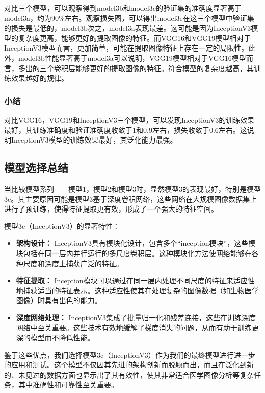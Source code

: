 对比三个模型，可以观察得到model3b和model3c的验证集的准确度显著高于model3a，约为90\%左右。观察损失图，可以得出model3c在这三个模型中验证集的损失是最低的，model3b次之，model3a表现最差。这可能是因为InceptionV3模型的复杂度更高，能够更好的提取图像的特征。而VGG16和VGG19模型相对于InceptionV3模型而言，更加简单，可能在提取图像特征上存在一定的局限性。此外，model3b性能显著高于model3a可以说明，VGG19模型相对于VGG16模型而言，多出的三个卷积层能够更好的提取图像的特征。符合模型的复杂度越高，其训练效果越好的规律。

\subsubsection{小结}

对比VGG16，VGG19和InceptionV3三个模型，可以发现InceptionV3的训练效果最好，其训练准确度和验证准确度收敛于1和0.9左右，损失收敛于0.6左右。这说明InceptionV3模型的训练效果最好，其泛化能力最强。

\subsection{模型选择总结}

当比较模型系列——模型1，模型2和模型3时，显然模型3的表现最好，特别是模型3c。其主要原因可能是模型3基于深度卷积网络，这些网络在大规模图像数据集上进行了预训练，使得特征提取更有效，形成了一个强大的特征空间。

模型3c（InceptionV3）的显著特性：

\begin{itemize} 
    \item \textbf{架构设计：} InceptionV3具有模块化设计，包含多个“inception模块”，这些模块包括在同一层内并行运行的多尺度卷积层。这种模块化方法使网络能够在各种尺度和深度上捕获广泛的特征。 
    \item \textbf{特征提取：} Inception模块可以通过在同一层内处理不同尺度的特征来适应性地捕获适当的特征表示。这种适应性使其在处理复杂的图像数据（如生物医学图像）时具有出色的能力。 
    \item \textbf{深度网络处理：} InceptionV3集成了批量归一化和残差连接，这些在训练深度网络中至关重要。这些技术有效地缓解了梯度消失的问题，从而有助于训练更深的模型而不降低性能。 
\end{itemize}

鉴于这些优点，我们选择模型3c（InceptionV3）作为我们的最终模型进行进一步的应用和测试。这个模型不仅因其先进的架构创新而脱颖而出，而且在泛化到新的、未见过的数据方面也显示出了其有效性，使其非常适合医学图像分析等复杂任务，其中准确性和可靠性至关重要。

